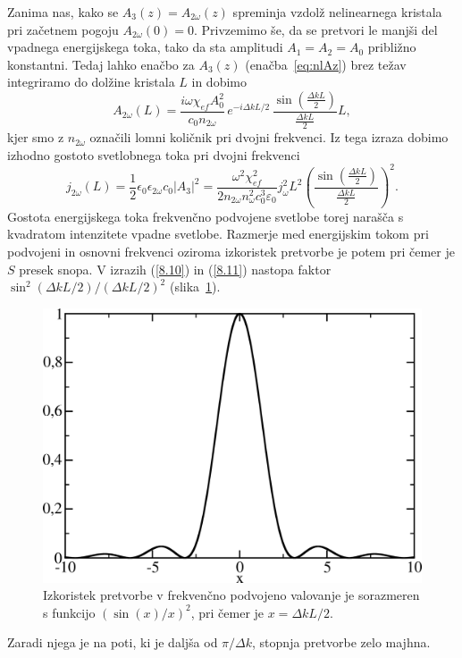 Zanima nas, kako se $A_{3}(z) = A_{2\omega}(z)$ spreminja vzdolž nelinearnega kristala
pri začetnem pogoju $A_{2\omega}(0)=0$.
Privzemimo še, da se pretvori le manjši del vpadnega energijskega toka,
tako da sta amplitudi $A_{1}=A_{2}=A_0$ približno konstantni. Tedaj lahko
enačbo za $A_{3}(z)$ (enačba~\ref{eq:nlAz}) brez težav integriramo do dolžine kristala $L$ in dobimo
\begin{equation}
A_{2\omega}(L)=\frac{i\omega \chi_{ef} A_0^2}{c_0 n_{2\omega}}
\,e^{-i\Delta kL/2}\, \frac{\sin\left(\frac{\Delta k L}{2}\right)}{\frac{\Delta kL}{2}}L,
\label{8.9}
\end{equation}
kjer smo z $n_{2\omega}$ označili lomni količnik pri dvojni frekvenci.
Iz tega izraza dobimo izhodno gostoto svetlobnega toka pri dvojni
frekvenci 
\begin{equation}
j_{2\omega}(L) =\frac{1}{2}\epsilon_{0}\epsilon_{2\omega}c_0|A_3|^2 = 
\frac{\omega^2 \chi_{ef}^2}{2 n_{2\omega} n_\omega^2c_0^3\varepsilon_0} j_\omega^2 L^2
\left(\frac{\sin\left(\frac{\Delta k L}{2}\right)}{\frac{\Delta kL}{2}}\right)^2.
\label{8.10}
\end{equation}
Gostota energijskega toka frekvenčno podvojene svetlobe torej narašča s kvadratom
intenzitete vpadne svetlobe. Razmerje med energijskim tokom pri podvojeni in osnovni frekvenci oziroma
izkoristek pretvorbe je potem
pri čemer je $S$ presek snopa. V izrazih (\ref{8.10}) in (\ref{8.11}) nastopa 
faktor $\sin^{2}(\Delta kL/2)/(\Delta kL/2)^{2}$ (slika~\ref{fig:shg2}). 
\begin{figure}[h]
\centering
\includegraphics[width=8truecm]{slike/08_shg2.png}
\caption{Izkoristek pretvorbe v frekvenčno podvojeno valovanje je sorazmeren s funkcijo $(\sin(x)/x)^2$,
pri čemer je $x = \Delta k L/2$.}
\label{fig:shg2}
\end{figure}
Zaradi njega je na poti, ki je daljša od $\pi /\Delta k$, stopnja pretvorbe zelo majhna.

